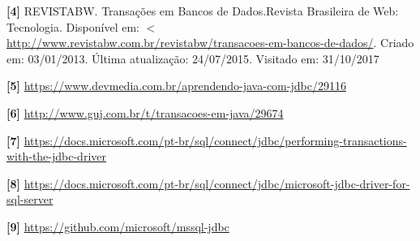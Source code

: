\documentclass[12pt,a4paper]{article}
\begin{document}
\noindent\textbf{[4]} REVISTABW. Transações em Bancos de Dados.Revista Brasileira de Web: Tecnologia. Disponível em: $<$\url{http://www.revistabw.com.br/revistabw/transacoes-em-bancos-de-dados/}. Criado em: 03/01/2013. Última atualização: 24/07/2015. Visitado em: 31/10/2017 \\\vspace{0.2cm}

\noindent\textbf{[5]} \url{https://www.devmedia.com.br/aprendendo-java-com-jdbc/29116}\\\vspace{0.2cm}

\noindent\textbf{[6]} \url{http://www.guj.com.br/t/transacoes-em-java/29674} \\\vspace{0.2cm}

\noindent\textbf{[7]} \url{https://docs.microsoft.com/pt-br/sql/connect/jdbc/performing-transactions-with-the-jdbc-driver} \\\vspace{0.2cm}

\noindent\textbf{[8]} \url{https://docs.microsoft.com/pt-br/sql/connect/jdbc/microsoft-jdbc-driver-for-sql-server}\\\vspace{0.2cm}

\noindent\textbf{[9]} \url{https://github.com/microsoft/mssql-jdbc}
\end{document}
